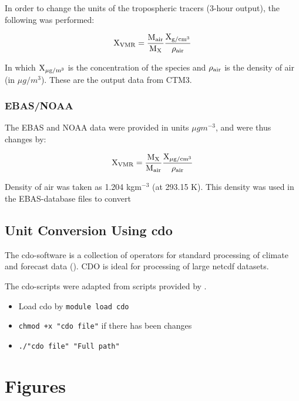 \medskip

In order to change the units of the tropospheric tracers (3-hour output), the following was performed: 

\begin{equation}
    \mathrm{X_{VMR}} = \frac{\mathrm{M_{air}}}{\mathrm{M_{X}}}\frac{\mathrm{X_{ g/cm^{3}}}}{\mathrm{\rho_{air}}}
    \label{eq:vmr_trop_tracer}
\end{equation}

In which  $\mathrm{X_{\mu g/m^{3}}}$ is the concentration of the species and $\mathrm{\rho_{air}}$ is the density of air (in $\mu g/m^{3}$). These are the output data from CTM3.


\subsection{EBAS/NOAA}\label{sec:unit_conversion_EBASNOAA}

The EBAS and NOAA data were provided in units $\mu g m^{-3}$, and were thus changes by: 

\begin{equation}
    \mathrm{X_{VMR}} = \frac{\mathrm{M_X}}{\mathrm{M_{air}}}\frac{\mathrm{X_{\mu g/cm^{3}}}}{\mathrm{\rho_{air}}}
\end{equation}

Density of air was taken as 1.204 kgm$^{-3}$ (at 293.15 K). This density was used in the EBAS-database files to convert


\section{Unit Conversion Using cdo}\label{sec:cdo}

The \acrshort{cdo}-software is a collection of operators for standard processing of climate and forecast data (\cite{cdo}). CDO is ideal for processing of large \acrshort{netcdf} datasets. 


\medskip

The \acrshort{cdo}-scripts were adapted from scripts provided by \cite{StefaniePersonal}. 



\begin{itemize}
    \item Load cdo by \texttt{module load cdo}
    \item \texttt{chmod +x "cdo file"} if there has been changes
    \item \texttt{./"cdo file" "Full path"} 
\end{itemize}

\cleardoublepage


\chapter{Figures}
\cleardoublepage
